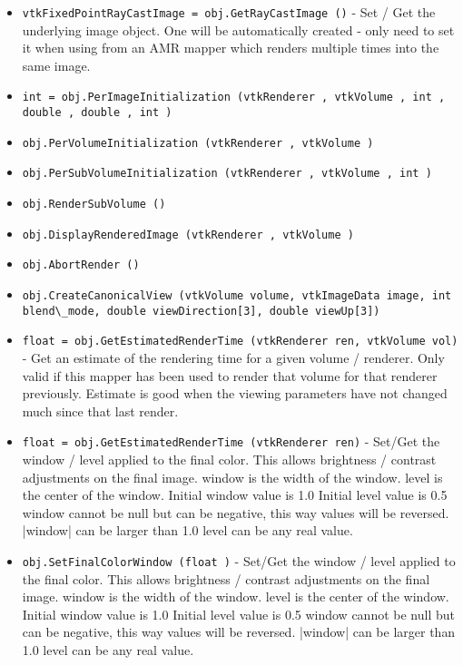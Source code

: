 \begin{itemize}
\item  \verb|vtkFixedPointRayCastImage = obj.GetRayCastImage ()| -  Set / Get the underlying image object. One will be automatically
 created - only need to set it when using from an AMR mapper which
 renders multiple times into the same image.

\item  \verb|int = obj.PerImageInitialization (vtkRenderer , vtkVolume , int , double , double , int )|

\item  \verb|obj.PerVolumeInitialization (vtkRenderer , vtkVolume )|

\item  \verb|obj.PerSubVolumeInitialization (vtkRenderer , vtkVolume , int )|

\item  \verb|obj.RenderSubVolume ()|

\item  \verb|obj.DisplayRenderedImage (vtkRenderer , vtkVolume )|

\item  \verb|obj.AbortRender ()|

\item  \verb|obj.CreateCanonicalView (vtkVolume volume, vtkImageData image, int blend\_mode, double viewDirection[3], double viewUp[3])|

\item  \verb|float = obj.GetEstimatedRenderTime (vtkRenderer ren, vtkVolume vol)| -  Get an estimate of the rendering time for a given volume / renderer.
 Only valid if this mapper has been used to render that volume for
 that renderer previously. Estimate is good when the viewing parameters
 have not changed much since that last render.

\item  \verb|float = obj.GetEstimatedRenderTime (vtkRenderer ren)| -  Set/Get the window / level applied to the final color.
 This allows brightness / contrast adjustments on the
 final image.
 window is the width of the window.
 level is the center of the window.
 Initial window value is 1.0
 Initial level value is 0.5
 window cannot be null but can be negative, this way
 values will be reversed.
 |window| can be larger than 1.0
 level can be any real value.

\item  \verb|obj.SetFinalColorWindow (float )| -  Set/Get the window / level applied to the final color.
 This allows brightness / contrast adjustments on the
 final image.
 window is the width of the window.
 level is the center of the window.
 Initial window value is 1.0
 Initial level value is 0.5
 window cannot be null but can be negative, this way
 values will be reversed.
 |window| can be larger than 1.0
 level can be any real value.


\end{itemize}
